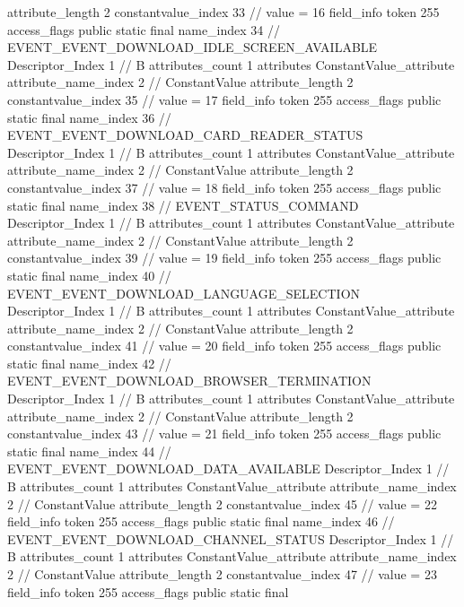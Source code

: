 {{{{{{{					attribute_length	2
					constantvalue_index	33		// value = 16
				}
				}
			}
			field_info {
				token	255
				access_flags	public static final
				name_index	34		// EVENT_EVENT_DOWNLOAD_IDLE_SCREEN_AVAILABLE
				Descriptor_Index	1		// B
				attributes_count	1
				attributes {
				ConstantValue_attribute {
					attribute_name_index	2		// ConstantValue
					attribute_length	2
					constantvalue_index	35		// value = 17
				}
				}
			}
			field_info {
				token	255
				access_flags	public static final
				name_index	36		// EVENT_EVENT_DOWNLOAD_CARD_READER_STATUS
				Descriptor_Index	1		// B
				attributes_count	1
				attributes {
				ConstantValue_attribute {
					attribute_name_index	2		// ConstantValue
					attribute_length	2
					constantvalue_index	37		// value = 18
				}
				}
			}
			field_info {
				token	255
				access_flags	public static final
				name_index	38		// EVENT_STATUS_COMMAND
				Descriptor_Index	1		// B
				attributes_count	1
				attributes {
				ConstantValue_attribute {
					attribute_name_index	2		// ConstantValue
					attribute_length	2
					constantvalue_index	39		// value = 19
				}
				}
			}
			field_info {
				token	255
				access_flags	public static final
				name_index	40		// EVENT_EVENT_DOWNLOAD_LANGUAGE_SELECTION
				Descriptor_Index	1		// B
				attributes_count	1
				attributes {
				ConstantValue_attribute {
					attribute_name_index	2		// ConstantValue
					attribute_length	2
					constantvalue_index	41		// value = 20
				}
				}
			}
			field_info {
				token	255
				access_flags	public static final
				name_index	42		// EVENT_EVENT_DOWNLOAD_BROWSER_TERMINATION
				Descriptor_Index	1		// B
				attributes_count	1
				attributes {
				ConstantValue_attribute {
					attribute_name_index	2		// ConstantValue
					attribute_length	2
					constantvalue_index	43		// value = 21
				}
				}
			}
			field_info {
				token	255
				access_flags	public static final
				name_index	44		// EVENT_EVENT_DOWNLOAD_DATA_AVAILABLE
				Descriptor_Index	1		// B
				attributes_count	1
				attributes {
				ConstantValue_attribute {
					attribute_name_index	2		// ConstantValue
					attribute_length	2
					constantvalue_index	45		// value = 22
				}
				}
			}
			field_info {
				token	255
				access_flags	public static final
				name_index	46		// EVENT_EVENT_DOWNLOAD_CHANNEL_STATUS
				Descriptor_Index	1		// B
				attributes_count	1
				attributes {
				ConstantValue_attribute {
					attribute_name_index	2		// ConstantValue
					attribute_length	2
					constantvalue_index	47		// value = 23
				}
				}
			}
			field_info {
				token	255
				access_flags	public static final
}}}}}
